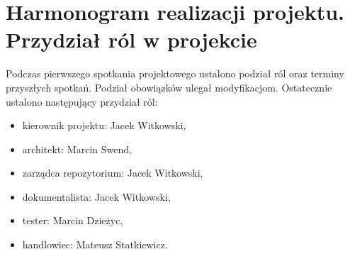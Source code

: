 \chapter[Harmonogram realizacji projektu. Przydział ról w projekcie][Harmonogram
realizacji projektu. Przydział ról w projekcie]{Harmonogram realizacji projektu.
Przydział ról w projekcie}
Podczas pierwszego spotkania projektowego ustalono podział ról oraz terminy
przyszłych spotkań. Podział obowiązków ulegał modyfikacjom. Ostatecznie
ustalono następujący przydział ról:
\begin{itemize}
  \item kierownik projektu: Jacek Witkowski,
  \item architekt: Marcin Swend,
  \item zarządca repozytorium: Jacek Witkowski,
  \item dokumentalista: Jacek Witkowski,
  \item tester: Marcin Dzieżyc,
  \item handlowiec: Mateusz Statkiewicz.
\end{itemize}

